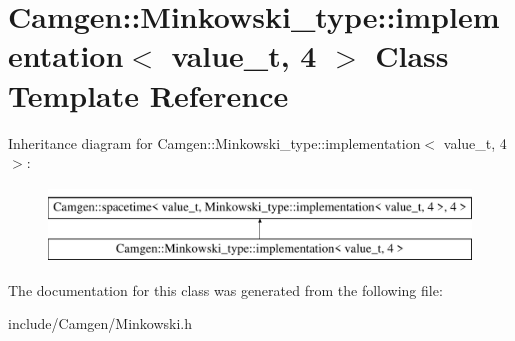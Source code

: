 \hypertarget{a00296}{\section{Camgen\-:\-:Minkowski\-\_\-type\-:\-:implementation$<$ value\-\_\-t, 4 $>$ Class Template Reference}
\label{a00296}
}
Inheritance diagram for Camgen\-:\-:Minkowski\-\_\-type\-:\-:implementation$<$ value\-\_\-t, 4 $>$\-:\begin{figure}[H]
\begin{center}
\leavevmode
\includegraphics[height=2.000000cm]{a00296}
\end{center}
\end{figure}


The documentation for this class was generated from the following file\-:\begin{DoxyCompactItemize}
\item 
include/\-Camgen/Minkowski.\-h\end{DoxyCompactItemize}
